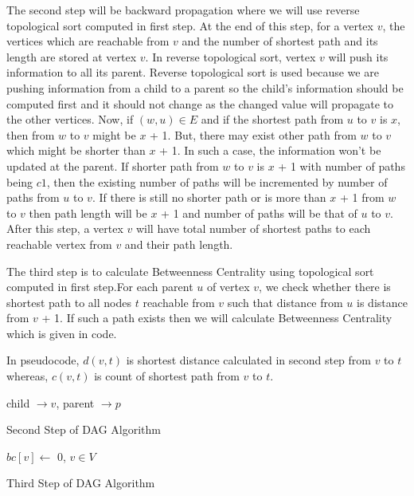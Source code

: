 \documentclass[MTech]{iitmdiss}
\begin{document}
The second step will be backward propagation where we will use reverse topological sort computed in first step. At the end of this step, for a vertex $v$, the vertices which are reachable from $v$ and the number of shortest path and its length are stored at vertex $v$. In reverse topological sort, vertex $v$ will push its information to all its parent. Reverse topological sort is used because we are pushing information from a child to a parent so the child's information should be computed first and it should not change as the changed value will propagate to the other vertices. Now, if $(w,u) \in E$ and if the shortest path from $u$ to $v$ is $x$, then from $w$ to $v$ might be $x$ + 1.
But, there may exist other path from $w$ to $v$ which might be shorter than $x$ + 1. In such a case, the information won't be updated at the parent.
If shorter path from $w$ to $v$ is $x$ + 1 with number of paths being $c1$, then the existing number of paths will be incremented by number of paths from $u$ to $v$. If there is still no shorter path or is more than $x$ + 1 from $w$ to $v$ then path length will be $x$ + 1 and number of paths will be that of $u$ to $v$.
After this step, a vertex $v$ will have total number of shortest paths to each reachable vertex from $v$ and their path length.

The third step is to calculate Betweenness Centrality using topological sort computed in first step.For each parent $u$ of vertex $v$, we check whether there is shortest path to all nodes $t$ reachable from $v$ such that distance from $u$ is distance from $v$ + 1. If such a path exists then we will calculate Betweenness Centrality which is given in code.

In pseudocode, $d(v,t)$ is shortest distance calculated in second step from $v$ to $t$ whereas, $c(v,t)$ is count of shortest path from $v$ to $t$.

\vspace{1em}
\begin{algorithm}
child $\rightarrow v$, parent $\rightarrow p$ \\
\caption{Second Step of DAG Algorithm}
\end{algorithm}

\vspace{1em}
\begin{algorithm}
$bc[v] \leftarrow$ 0, $v \in V$\;
\caption{Third Step of DAG Algorithm}
\end{algorithm}
\end{document}
